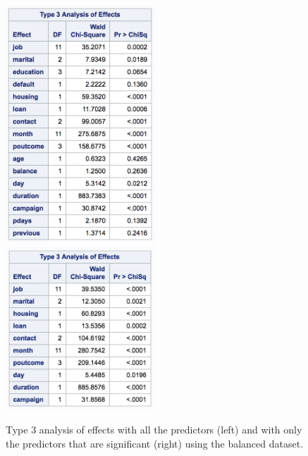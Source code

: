 \documentclass[]{article}
\begin{document}
\begin{figure}
  \centering
    \includegraphics[width=0.5\textwidth]{images/fig20a_typeIII.png} 
    \includegraphics[width=0.5\textwidth]{images/fig20b_typeIII.png}
  \caption{Type 3 analysis of effects with all the predictors (left) and with only the predictors that are significant (right) using the balanced dataset.}
  \label{fig20}
\end{figure}
\end{document}
